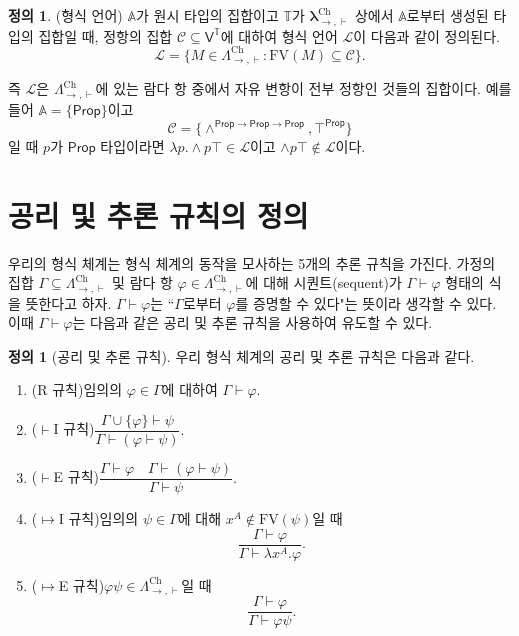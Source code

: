 \documentclass[10pt,twocolumn]{article}
\theoremstyle{definition}
\newtheorem{definition}[theorem]{정의}
\newcommand{\Prop}{\mathsf{Prop}}
\newcommand{\lchh}{\bm\lambda_{\to,\vdash}^{\text{Ch}}}
\newcommand{\Lchh}{\Lambda_{\to,\vdash}^{\text{Ch}}}
\begin{document}
\begin{definition}(형식 언어)
	$\mathbb A$가 원시 타입의 집합이고 $\mathds T$가 $\lchh$ 상에서 $\mathbb A$로부터 생성된 타입의 집합일 때, 정항의 집합 $\mathcal C\subseteq \mathsf V^{\mathds T}$에 대하여 형식 언어 $\mathcal L$이 다음과 같이 정의된다.
	$$\mathcal L = \{M\in\Lchh: \mathrm{FV}(M)\subseteq\mathcal C\}.$$
\end{definition}

즉 $\mathcal L$은 $\Lchh$에 있는 람다 항 중에서 자유 변항이 전부 정항인 것들의 집합이다. 예를 들어 $\mathbb A = \{\Prop\}$이고 $$\mathcal C = \{\land^{\Prop\to\Prop\to\Prop}, \top^{\Prop}\}$$일 때 $p$가 $\Prop$ 타입이라면 $\lambda p.{\land}p\top\in\mathcal L$이고 ${\land}p\top\notin\mathcal L$이다.

\section{공리 및 추론 규칙의 정의}

우리의 형식 체계는 형식 체계의 동작을 모사하는 5개의 추론 규칙을 가진다. 가정의 집합 $\Gamma\subseteq\Lchh$ 및 람다 항 $\varphi\in\Lchh$에 대해 시퀀트(sequent)가 $\Gamma\vdash\varphi$ 형태의 식을 뜻한다고 하자. $\Gamma\vdash\varphi$는 ``$\Gamma$로부터 $\varphi$를 증명할 수 있다"는 뜻이라 생각할 수 있다. 이때 $\Gamma\vdash\varphi$는 다음과 같은 공리 및 추론 규칙을 사용하여 유도할 수 있다.

\begin{definition}[공리 및 추론 규칙]
	우리 형식 체계의 공리 및 추론 규칙은 다음과 같다.
	
	\begin{enumerate}
		\item (R 규칙)\quad 임의의 $\varphi\in\Gamma$에 대하여 $\Gamma\vdash\varphi.$
		\item ($\vdash$I 규칙)\quad $\dfrac{\Gamma\cup\{\varphi\}\vdash\psi}{\Gamma\vdash(\varphi\vdash\psi)}.$
		\item ($\vdash$E 규칙)\quad $\dfrac{\Gamma\vdash\varphi\quad\Gamma\vdash(\varphi\vdash\psi)}{\Gamma\vdash\psi}.$
		\item ($\mapsto$I 규칙)\quad 임의의 $\psi\in\Gamma$에 대해 $x^A\notin\mathrm{FV}(\psi)$일 때 $$\dfrac{\Gamma\vdash\varphi}{\Gamma\vdash\lambda x^A.\varphi}.$$
		\item ($\mapsto$E 규칙)\quad $\varphi\psi\in\Lchh$일 때 $$\dfrac{\Gamma\vdash\varphi}{\Gamma\vdash\varphi\psi}.$$
	\end{enumerate}
\end{definition}
\end{document}
